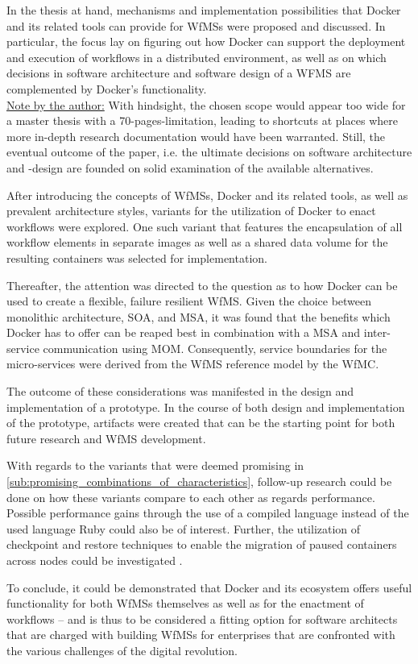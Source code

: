 
In the thesis at hand, mechanisms and implementation possibilities that Docker and its related tools can provide for \acp{WfMS} were proposed and discussed. In particular, the focus lay on figuring out how Docker can support the deployment and execution of workflows in a distributed environment, as well as on which decisions in software architecture and software design of a WFMS are complemented by Docker's functionality.
\\\underline{Note by the author:} With hindsight, the chosen scope would appear too wide for a master thesis with a 70-pages-limitation, leading to shortcuts at places where more in-depth research documentation would have been warranted. Still, the eventual outcome of the paper, i.e. the ultimate decisions on software architecture and -design are founded on solid examination of the available alternatives.

After introducing the concepts of \acp{WfMS}, Docker and its related tools, as well as prevalent architecture styles, variants for the utilization of Docker to enact workflows were explored. One such variant that features the encapsulation of all workflow elements in separate images as well as a shared data volume for the resulting containers was selected for implementation.

Thereafter, the attention was directed to the question as to how Docker can be used to create a flexible, failure resilient \ac{WfMS}. Given the choice between monolithic architecture, \ac{SOA}, and \ac{MSA}, it was found that the benefits which Docker has to offer can be reaped best in combination with a \ac{MSA} and inter-service communication using \ac{MOM}. Consequently, service boundaries for the micro-services were derived from the \ac{WfMS} reference model by the \ac{WfMC}.

The outcome of these considerations was manifested in the design and implementation of a prototype. In the course of both design and implementation of the prototype, artifacts were created that can be the starting point for both future research and \ac{WfMS} development.

With regards to the variants that were deemed promising in \ref{sub:promising_combinations_of_characteristics}, follow-up research could be done on how these variants compare to each other as regards performance. Possible performance gains through the use of a compiled language instead of the used language Ruby could also be of interest. Further, the utilization of checkpoint and restore techniques to enable the migration of paused containers across nodes could be investigated \cite{Kim2015Checkpoint,Merker2015How}.

To conclude, it could be demonstrated that Docker and its ecosystem offers useful functionality for both \acp{WfMS} themselves as well as for the enactment of workflows – and is thus to be considered a fitting option for software architects that are charged with building \acp{WfMS} for enterprises that are confronted with the various challenges of the digital revolution.
